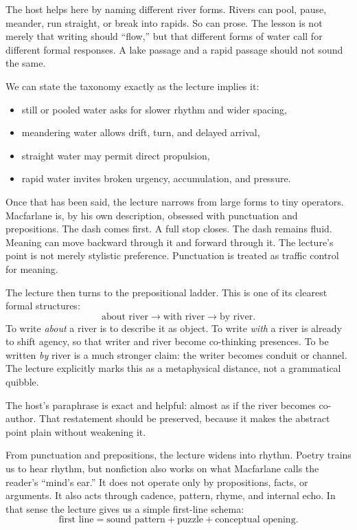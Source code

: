 The host helps here by naming different river forms. Rivers can pool, pause, meander, run straight, or break into rapids. So can prose. The lesson is not merely that writing should ``flow,'' but that different forms of water call for different formal responses. A lake passage and a rapid passage should not sound the same.

We can state the taxonomy exactly as the lecture implies it:
\begin{itemize}
\item still or pooled water asks for slower rhythm and wider spacing,
\item meandering water allows drift, turn, and delayed arrival,
\item straight water may permit direct propulsion,
\item rapid water invites broken urgency, accumulation, and pressure.
\end{itemize}

Once that has been said, the lecture narrows from large forms to tiny operators. Macfarlane is, by his own description, obsessed with punctuation and prepositions. The dash comes first. A full stop closes. The dash remains fluid. Meaning can move backward through it and forward through it. The lecture's point is not merely stylistic preference. Punctuation is treated as traffic control for meaning.

The lecture then turns to the prepositional ladder. This is one of its clearest formal structures:
\begin{equation}
\text{about river} \longrightarrow \text{with river} \longrightarrow \text{by river}.
\end{equation}
To write \emph{about} a river is to describe it as object. To write \emph{with} a river is already to shift agency, so that writer and river become co-thinking presences. To be written \emph{by} river is a much stronger claim: the writer becomes conduit or channel. The lecture explicitly marks this as a metaphysical distance, not a grammatical quibble.

The host's paraphrase is exact and helpful: almost as if the river becomes co-author. That restatement should be preserved, because it makes the abstract point plain without weakening it.

From punctuation and prepositions, the lecture widens into rhythm. Poetry trains us to hear rhythm, but nonfiction also works on what Macfarlane calls the reader's ``mind's ear.'' It does not operate only by propositions, facts, or arguments. It also acts through cadence, pattern, rhyme, and internal echo. In that sense the lecture gives us a simple first-line schema:
\begin{equation}
\text{first line} = \text{sound pattern} + \text{puzzle} + \text{conceptual opening}.
\end{equation}

